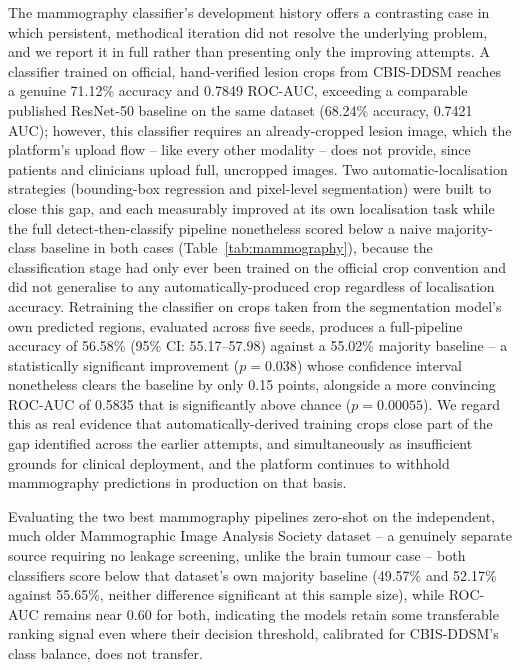 \documentclass[conference]{IEEEtran}
\begin{document}
The mammography classifier's development history offers a contrasting case in which persistent, methodical iteration did not resolve the underlying problem, and we report it in full rather than presenting only the improving attempts. A classifier trained on official, hand-verified lesion crops from CBIS-DDSM reaches a genuine 71.12\% accuracy and 0.7849 ROC-AUC, exceeding a comparable published ResNet-50 baseline on the same dataset \cite{jaamour2024} (68.24\% accuracy, 0.7421 AUC); however, this classifier requires an already-cropped lesion image, which the platform's upload flow -- like every other modality -- does not provide, since patients and clinicians upload full, uncropped images. Two automatic-localisation strategies (bounding-box regression and pixel-level segmentation) were built to close this gap, and each measurably improved at its own localisation task while the full detect-then-classify pipeline nonetheless scored below a naive majority-class baseline in both cases (Table~\ref{tab:mammography}), because the classification stage had only ever been trained on the official crop convention and did not generalise to any automatically-produced crop regardless of localisation accuracy. Retraining the classifier on crops taken from the segmentation model's own predicted regions, evaluated across five seeds, produces a full-pipeline accuracy of 56.58\% (95\% CI: 55.17--57.98) against a 55.02\% majority baseline -- a statistically significant improvement ($p=0.038$) whose confidence interval nonetheless clears the baseline by only 0.15 points, alongside a more convincing ROC-AUC of 0.5835 that is significantly above chance ($p=0.00055$). We regard this as real evidence that automatically-derived training crops close part of the gap identified across the earlier attempts, and simultaneously as insufficient grounds for clinical deployment, and the platform continues to withhold mammography predictions in production on that basis.

Evaluating the two best mammography pipelines zero-shot on the independent, much older Mammographic Image Analysis Society dataset \cite{suckling1994} -- a genuinely separate source requiring no leakage screening, unlike the brain tumour case -- both classifiers score below that dataset's own majority baseline (49.57\% and 52.17\% against 55.65\%, neither difference significant at this sample size), while ROC-AUC remains near 0.60 for both, indicating the models retain some transferable ranking signal even where their decision threshold, calibrated for CBIS-DDSM's class balance, does not transfer.
\end{document}
